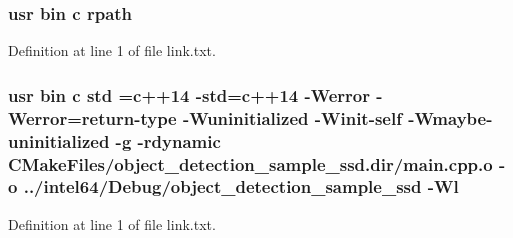 \subsubsection[{\texorpdfstring{rpath}{rpath}}]{\setlength{\rightskip}{0pt plus 5cm}usr bin {\bf c} rpath}\hypertarget{object__detection__sample__ssd_2CMakeFiles_2object__detection__sample__ssd_8dir_2link_8txt_ab9d7fd7120fafa2118a4e08c1df697c7}{}\label{object__detection__sample__ssd_2CMakeFiles_2object__detection__sample__ssd_8dir_2link_8txt_ab9d7fd7120fafa2118a4e08c1df697c7}


Definition at line 1 of file link.\+txt.

\subsubsection[{\texorpdfstring{std}{std}}]{\setlength{\rightskip}{0pt plus 5cm}usr bin {\bf c} std ={\bf c}++14 -\/std={\bf c}++14 -\/Werror -\/Werror=return-\/type -\/Wuninitialized -\/Winit-\/self -\/Wmaybe-\/uninitialized -\/g -\/rdynamic C\+Make\+Files/object\+\_\+detection\+\_\+sample\+\_\+ssd.\+dir/main.\+cpp.\+o -\/o ../intel64/Debug/object\+\_\+detection\+\_\+sample\+\_\+ssd -\/{\bf Wl}}\hypertarget{object__detection__sample__ssd_2CMakeFiles_2object__detection__sample__ssd_8dir_2link_8txt_a1ccfea5f558575a112db71eeb271fabf}{}\label{object__detection__sample__ssd_2CMakeFiles_2object__detection__sample__ssd_8dir_2link_8txt_a1ccfea5f558575a112db71eeb271fabf}


Definition at line 1 of file link.\+txt.

